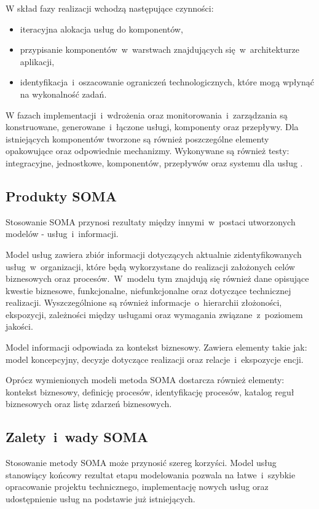 W skład fazy realizacji wchodzą następujące czynności:
\begin{itemize}
\item{iteracyjna alokacja usług do komponentów,}
\item{przypisanie komponentów~w~warstwach znajdujących się~w~architekturze aplikacji,}
\item{identyfikacja~i~oszacowanie ograniczeń technologicznych, które mogą wpłynąć na wykonalność zadań.}
\end{itemize}

W fazach implementacji~i~wdrożenia oraz monitorowania~i~zarządzania są konstruowane, generowane~i~łączone usługi, komponenty oraz przepływy. Dla istniejących komponentów tworzone są również poszczególne elementy opakowujące oraz odpowiednie mechanizmy. Wykonywane są również testy: integracyjne, jednostkowe, komponentów, przepływów oraz systemu dla usług  \cite{PlatIntGor, SOMAArsIBMJour}.

\subsection{Produkty SOMA}
Stosowanie SOMA przynosi rezultaty między innymi~w~postaci utworzonych modelów - usług~i~informacji. 

Model usług zawiera zbiór informacji dotyczących aktualnie zidentyfikowanych usług~w~organizacji, które będą wykorzystane do realizacji założonych celów biznesowych oraz procesów.~W~modelu tym znajdują się również dane opisujące kwestie biznesowe, funkcjonalne, niefunkcjonalne oraz dotyczące technicznej realizacji. Wyszczególnione są również informacje~o~hierarchii złożoności, ekspozycji, zależności między usługami oraz wymagania związane~z~poziomem jakości. 

Model informacji odpowiada za kontekst biznesowy. Zawiera elementy takie jak: model koncepcyjny, decyzje dotyczące realizacji oraz relacje~i~ekspozycje encji.

Oprócz wymienionych modeli metoda SOMA dostarcza również elementy: kontekst biznesowy, definicję procesów, identyfikację procesów, katalog reguł biznesowych oraz listę zdarzeń biznesowych.

\subsection{Zalety~i~wady SOMA}
Stosowanie metody SOMA może przynosić szereg korzyści. Model usług stanowiący końcowy rezultat etapu modelowania pozwala na łatwe~i~szybkie opracowanie projektu technicznego, implementację nowych usług oraz udostępnienie usług na podstawie już istniejących. 

